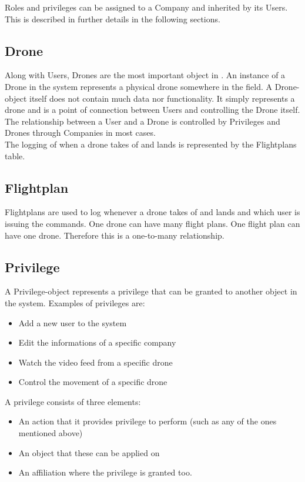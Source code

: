 Roles and privileges can be assigned to a Company and inherited by its Users.
This is described in further details in the following sections.


\subsection{Drone}
Along with Users, Drones are the most important object in \projectname{}.
An instance of a Drone in the system represents a physical drone somewhere in the field.
A Drone-object itself does not contain much data nor functionality.
It simply represents a drone and is a point of connection between Users and controlling the Drone itself. \\

The relationship between a User and a Drone is controlled by Privileges and Drones through Companies in most cases. \\

The logging of when a drone takes of and lands is represented by the Flightplans table.


\subsection{Flightplan}
Flightplans are used to log whenever a drone takes of and lands and which user is issuing the commands.
One drone can have many flight plans.
One flight plan can have one drone.
Therefore this is a one-to-many relationship.


\subsection{Privilege}
\label{sec:privileges}
A Privilege-object represents a privilege that can be granted to another object in the system.
Examples of privileges are:

\begin{itemize}
    \item Add a new user to the system
    \item Edit the informations of a specific company
    \item Watch the video feed from a specific drone
    \item Control the movement of a specific drone
\end{itemize}

A privilege consists of three elements:

\begin{itemize}
    \item An action that it provides privilege to perform (such as any of the ones mentioned above)
    \item An object that these can be applied on
    \item An affiliation where the privilege is granted too.
\end{itemize}

